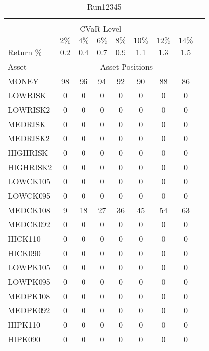 \begin{table}[h!t]
\caption{Run12345}
\centering
\begin{tabular}[t]{ l c c c c c c c c }
\hline\hline \\
\multicolumn{8}{c}{CVaR Level} \\
 & $2\%$ & $4\%$ & $6\%$ & $8\%$ & $10\%$ & $12\%$ & $14\%$ \\[0.5ex]
Return \% &0.2 &0.4 &0.7 &0.9 &1.1 &1.3 &1.5\\[0.5ex]
Asset & \multicolumn{7}{c}{Asset Positions} \\[1ex]
MONEY & 98 & 96 & 94 & 92 & 90 & 88 & 86\\
LOWRISK & 0 & 0 & 0 & 0 & 0 & 0 & 0\\
LOWRISK2 & 0 & 0 & 0 & 0 & 0 & 0 & 0\\
MEDRISK & 0 & 0 & 0 & 0 & 0 & 0 & 0\\
MEDRISK2 & 0 & 0 & 0 & 0 & 0 & 0 & 0\\
HIGHRISK & 0 & 0 & 0 & 0 & 0 & 0 & 0\\
HIGHRISK2 & 0 & 0 & 0 & 0 & 0 & 0 & 0\\
LOWCK105 & 0 & 0 & 0 & 0 & 0 & 0 & 0\\
LOWCK095 & 0 & 0 & 0 & 0 & 0 & 0 & 0\\
MEDCK108 & 9 & 18 & 27 & 36 & 45 & 54 & 63\\
MEDCK092 & 0 & 0 & 0 & 0 & 0 & 0 & 0\\
HICK110 & 0 & 0 & 0 & 0 & 0 & 0 & 0\\
HICK090 & 0 & 0 & 0 & 0 & 0 & 0 & 0\\
LOWPK105 & 0 & 0 & 0 & 0 & 0 & 0 & 0\\
LOWPK095 & 0 & 0 & 0 & 0 & 0 & 0 & 0\\
MEDPK108 & 0 & 0 & 0 & 0 & 0 & 0 & 0\\
MEDPK092 & 0 & 0 & 0 & 0 & 0 & 0 & 0\\
HIPK110 & 0 & 0 & 0 & 0 & 0 & 0 & 0\\
HIPK090 & 0 & 0 & 0 & 0 & 0 & 0 & 0\\
[1ex] \hline
\end{tabular}
\end{table} 
